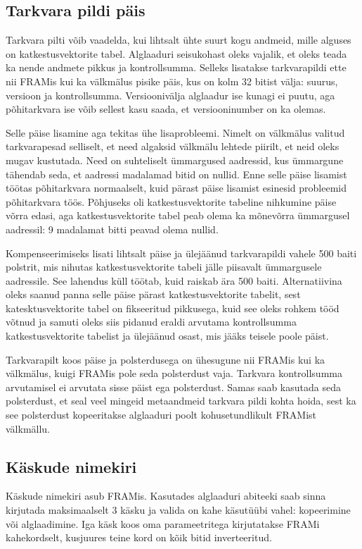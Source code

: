 \documentclass[12pt,a4paper]{article}
\begin{document}
\subsection{Tarkvara pildi päis}
Tarkvara pilti võib vaadelda, kui lihtsalt ühte suurt kogu andmeid, mille
alguses on katkestusvektorite tabel. Alglaaduri seisukohast oleks vajalik, et
oleks teada ka nende andmete pikkus ja kontrollsumma. Selleks lisatakse
tarkvarapildi ette nii FRAMis kui ka välkmälus pisike päis, kus on kolm 32
bitist välja: suurus, versioon ja kontrollsumma. Versioonivälja alglaadur ise
kunagi ei puutu, aga põhitarkvara ise võib sellest kasu saada, et
versiooninumber on ka olemas.

Selle päise lisamine aga tekitas ühe lisaprobleemi. Nimelt on välkmälus valitud
tarkvarapesad selliselt, et need algaksid välkmälu lehtede piirilt, et neid
oleks mugav kustutada. Need on suhteliselt ümmargused aadressid, kus ümmargune
tähendab seda, et aadressi madalamad bitid on nullid. Enne selle päise lisamist
töötas põhitarkvara normaalselt, kuid pärast päise lisamist esinesid probleemid
põhitarkvara töös. Põhjuseks oli katkestusvektorite tabeline nihkumine päise
võrra edasi, aga katkestusvektorite tabel peab olema ka mõnevõrra ümmargusel
aadressil: 9 madalamat bitti peavad olema nullid\cite{cm3pm}.

Kompenseerimiseks lisati lihtsalt päise ja ülejäänud tarkvarapildi vahele 500
baiti polstrit, mis nihutas katkestusvektorite tabeli jälle piisavalt
ümmargusele aadressile. See lahendus küll töötab, kuid raiskab ära 500 baiti.
Alternatiivina oleks saanud panna selle päise pärast katkestusvektorite tabelit,
sest katesktusvektorite tabel on fikseeritud pikkusega, kuid see oleks rohkem
tööd võtnud ja samuti oleks siis pidanud eraldi arvutama kontrollsumma
katkestusvektorite tabelist ja ülejäänud osast, mis jääks teisele poole päist.

Tarkvarapilt koos päise ja polsterdusega on ühesugune nii FRAMis kui ka
välkmälus, kuigi FRAMis pole seda polsterdust vaja. Tarkvara kontrollsumma
arvutamisel ei arvutata sisse päist ega polsterdust. Samas saab kasutada seda
polsterdust, et seal veel mingeid metaandmeid tarkvara pildi kohta hoida, sest ka
see polsterdust kopeeritakse alglaaduri poolt kohusetundlikult FRAMist
välkmällu.

\subsection{Käskude nimekiri}
Käskude nimekiri asub FRAMis. Kasutades alglaaduri abiteeki saab sinna kirjutada
maksimaalselt 3 käsku ja valida on kahe käsutüübi vahel: kopeerimine või
alglaadimine. Iga käsk koos oma parameetritega kirjutatakse FRAMi kahekordselt,
kusjuures teine kord on kõik bitid inverteeritud. 
\end{document}
